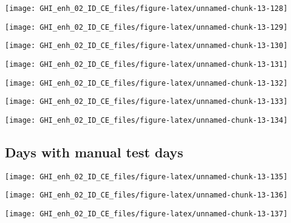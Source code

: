 \documentclass[
  10pt,
  a4paper,oneside]{article}
\begin{document}
\begin{center}\texttt{[image: GHI\_enh\_02\_ID\_CE\_files/figure-latex/unnamed-chunk-13-128]} \end{center}

\begin{center}\texttt{[image: GHI\_enh\_02\_ID\_CE\_files/figure-latex/unnamed-chunk-13-129]} \end{center}

\begin{center}\texttt{[image: GHI\_enh\_02\_ID\_CE\_files/figure-latex/unnamed-chunk-13-130]} \end{center}

\begin{center}\texttt{[image: GHI\_enh\_02\_ID\_CE\_files/figure-latex/unnamed-chunk-13-131]} \end{center}

\begin{center}\texttt{[image: GHI\_enh\_02\_ID\_CE\_files/figure-latex/unnamed-chunk-13-132]} \end{center}

\begin{center}\texttt{[image: GHI\_enh\_02\_ID\_CE\_files/figure-latex/unnamed-chunk-13-133]} \end{center}

\begin{center}\texttt{[image: GHI\_enh\_02\_ID\_CE\_files/figure-latex/unnamed-chunk-13-134]} \end{center}

\FloatBarrier

\hypertarget{days-with-manual-test-days}{%
\subsection{Days with manual test days}\label{days-with-manual-test-days}}

\begin{center}\texttt{[image: GHI\_enh\_02\_ID\_CE\_files/figure-latex/unnamed-chunk-13-135]} \end{center}

\begin{center}\texttt{[image: GHI\_enh\_02\_ID\_CE\_files/figure-latex/unnamed-chunk-13-136]} \end{center}

\begin{center}\texttt{[image: GHI\_enh\_02\_ID\_CE\_files/figure-latex/unnamed-chunk-13-137]} \end{center}
\end{document}
